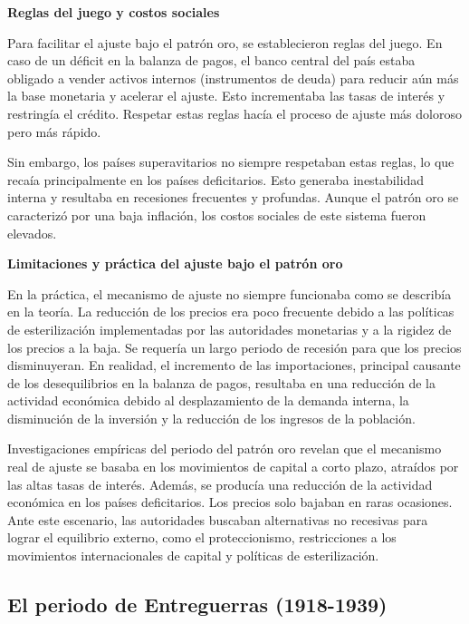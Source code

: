 \documentclass[
  a4paper,
]{article}
\begin{document}
\textbf{Reglas del juego y costos sociales}

Para facilitar el ajuste bajo el patrón oro, se establecieron reglas del
juego. En caso de un déficit en la balanza de pagos, el banco central
del país estaba obligado a vender activos internos (instrumentos de
deuda) para reducir aún más la base monetaria y acelerar el ajuste. Esto
incrementaba las tasas de interés y restringía el crédito. Respetar
estas reglas hacía el proceso de ajuste más doloroso pero más rápido.

Sin embargo, los países superavitarios no siempre respetaban estas
reglas, lo que recaía principalmente en los países deficitarios. Esto
generaba inestabilidad interna y resultaba en recesiones frecuentes y
profundas. Aunque el patrón oro se caracterizó por una baja inflación,
los costos sociales de este sistema fueron elevados.

\textbf{Limitaciones y práctica del ajuste bajo el patrón oro}

En la práctica, el mecanismo de ajuste no siempre funcionaba como se
describía en la teoría. La reducción de los precios era poco frecuente
debido a las políticas de esterilización implementadas por las
autoridades monetarias y a la rigidez de los precios a la baja. Se
requería un largo periodo de recesión para que los precios disminuyeran.
En realidad, el incremento de las importaciones, principal causante de
los desequilibrios en la balanza de pagos, resultaba en una reducción de
la actividad económica debido al desplazamiento de la demanda interna,
la disminución de la inversión y la reducción de los ingresos de la
población.

Investigaciones empíricas del periodo del patrón oro revelan que el
mecanismo real de ajuste se basaba en los movimientos de capital a corto
plazo, atraídos por las altas tasas de interés. Además, se producía una
reducción de la actividad económica en los países deficitarios. Los
precios solo bajaban en raras ocasiones. Ante este escenario, las
autoridades buscaban alternativas no recesivas para lograr el equilibrio
externo, como el proteccionismo, restricciones a los movimientos
internacionales de capital y políticas de esterilización.

\hypertarget{el-periodo-de-entreguerras-1918-1939}{%
\subsection{El periodo de Entreguerras
(1918-1939)}\label{el-periodo-de-entreguerras-1918-1939}}
\end{document}

